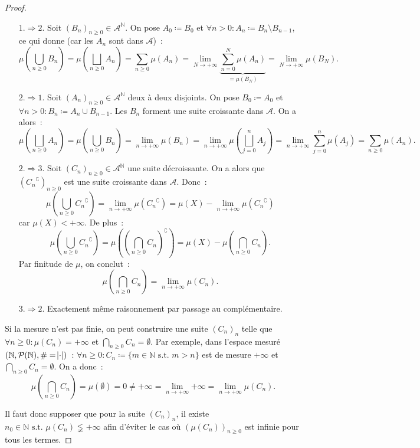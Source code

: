 \documentclass{article}
\theoremstyle{definition}
\newcommand{\pinfty}{{+\infty}}
\newcommand{\st}{\text{ s.t. }}
\newcommand{\C}{\complement}
\newcommand{\N}{{\mathbb N}}
\begin{document}
\begin{proof}~
\begin{itemize}
	\item[\underline {$1. \Rightarrow 2.$}] Soit $(B_n)_{n \geq 0} \in \mathcal A^\N$. On pose $A_0 \coloneqq B_0$ et $\forall n > 0 : A_n \coloneqq B_n \setminus B_{n-1}$,
	ce qui donne (car les $A_n$ sont dans $\mathcal A$)~:
	\[\mu\left(\bigcup_{n \geq 0}B_n\right) = \mu\left(\bigsqcup_{n \geq 0}A_n\right) = \sum_{n \geq 0}\mu(A_n)
	  = \lim_{N \to \pinfty}\underbrace {\sum_{n=0}^N\mu(A_n)}_{= \mu(B_N)} = \lim_{N \to \pinfty}\mu(B_N).\]
	\item[\underline {$2. \Rightarrow 1.$}] Soit $(A_n)_{n \geq 0} \in \mathcal A^\N$ deux à deux disjoints.
	On pose $B_0 \coloneqq A_0$ et $\forall n > 0 : B_n \coloneqq A_n \cup B_{n-1}$. Les $B_n$ forment une suite croissante dans $\mathcal A$. On a alors~:
	\[\mu\left(\bigsqcup_{n \geq 0}A_n\right) = \mu\left(\bigcup_{n \geq 0}B_n\right) = \lim_{n \to \pinfty}\mu(B_n) = \lim_{n \to \pinfty}\mu\left(\bigsqcup_{j=0}^nA_j\right)
	  = \lim_{n \to \pinfty}\sum_{j=0}^n\mu(A_j) = \sum_{n \geq 0}\mu(A_n).\]
	\item[\underline {$2. \Rightarrow 3.$}] Soit $(C_n)_{n \geq 0} \in \mathcal A^\N$ une suite décroissante. On a alors que $({C_n}^\C)_{n \geq 0}$ est une suite croissante dans
	$\mathcal A$. Donc~:
	\[\mu\left(\bigcup_{n \geq 0}{C_n}^\C\right) = \lim_{n \to \pinfty}\mu({C_n}^\C) = \mu(X) - \lim_{n \to \pinfty}\mu({C_n}^\C)\]
	car $\mu(X) < \pinfty$. De plus~:
	\[\mu\left(\bigcup_{n \geq 0}{C_n}^\C\right) = \mu\left(\left(\bigcap_{n \geq 0}C_n\right)^\C\right) = \mu(X) - \mu\left(\bigcap_{n \geq 0}C_n\right).\]
	Par finitude de $\mu$, on conclut~:
	\[\mu\left(\bigcap_{n \geq 0}C_n\right) = \lim_{n \to \pinfty}\mu(C_n).\]
	\item[\underline {$3. \Rightarrow 2.$}] Exactement même raisonnement par passage au complémentaire.
\end{itemize}

Si la mesure n'est pas finie, on peut construire une suite $(C_n)_n$ telle que $\forall n \geq 0 : \mu(C_n) = \pinfty$ et $\bigcap_{n \geq 0}C_n = \emptyset$. Par exemple,
dans l'espace mesuré $(\N, \mathcal P(\N), \# = \abs \cdot)$~: $\forall n \geq 0 : C_n \coloneqq \{m \in \N \st m > n\}$ est de mesure $\pinfty$ et
$\bigcap_{n \geq 0}C_n = \emptyset$. On a donc~:
\[\mu\left(\bigcap_{n \geq 0}C_n\right) = \mu(\emptyset) = 0 \neq \pinfty = \lim_{n \to \pinfty}\pinfty = \lim_{n \to \pinfty}\mu(C_n).\]

Il faut donc supposer que pour la suite $(C_n)_n$, il existe $n_0 \in \N \st \mu(C_n) \lneqq \pinfty$ afin d'éviter le cas où $(\mu(C_n))_{n \geq 0}$ est infinie pour tous les termes.
\end{proof}
\end{document}
